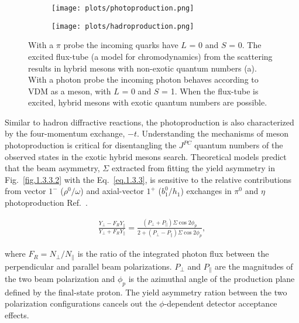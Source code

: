  \begin{figure}[H]
    \centering
    \begin{subfigure}[b]{0.45\textwidth}
        \texttt{[image: plots/photoproduction.png]}
        \caption{}
        \label{fig.1.3.3.1.a}
    \end{subfigure}\hfill
    \begin{subfigure}[b]{0.4\textwidth}
        \texttt{[image: plots/hadroproduction.png]}
        \caption{}
        \label{fig.1.3.3.1.b}
    \end{subfigure}
    \caption{With a $\pi$ probe the incoming quarks have $L$ = 0 and $S$ = 0. The excited flux-tube (a model for chromodynamics) from the scattering results in hybrid mesons with non-exotic quantum numbers (a). With a photon probe the incoming photon behaves according to VDM as a meson, with $L$ = 0 and $S$ = 1. When the flux-tube is excited, hybrid mesons with exotic quantum numbers are possible.}
    \label{fig.1.3.3.1}
\end{figure}

Similar to hadron diffractive reactions, the photoproduction is also characterized by the four-momentum exchange, $-t$. Understanding the mechanisms of meson photoproduction is critical for disentangling the $J^{PC}$ quantum numbers of the observed states in the exotic hybrid mesons search. Theoretical models predict that the beam asymmetry, $\Sigma$ extracted from fitting the yield asymmetry in Fig.~\ref{fig.1.3.3.2} with the Eq.~\ref{eq.1.3.3}, is sensitive to the relative contributions from vector $1^{-}$ ($\rho^{0}/\omega$) and axial-vector $1^{+}$ ($b_{1}^{0}/h_{1}$) exchanges in $\pi^{0}$ and $\eta$ photoproduction Ref.~\cite{Ghoul17}.

\begin{align}
    \frac{Y_{\perp}-F_{R}Y_{\parallel}}{Y_{\perp}+F_{R}Y_{\parallel}} = \frac{(P_{\perp}+P_{\parallel})\Sigma \cos 2\phi_{p}}{2+(P_{\perp}-P_{\parallel})\Sigma \cos 2\phi_{p}},
    \label{eq.1.3.3}
\end{align}

\noindent where $F_{R} = N_{\perp}/N_{\parallel}$ is the ratio of the integrated photon flux between the perpendicular and parallel beam polarizations. $P_{\perp}$ and $P_{\parallel}$ are the magnitudes of the two beam polarization and $\phi_{p}$ is the azimuthal angle of the production plane defined by the final-state proton. The yield asymmetry ration between the two polarization configurations cancels out the $\phi$-dependent detector acceptance effects.

